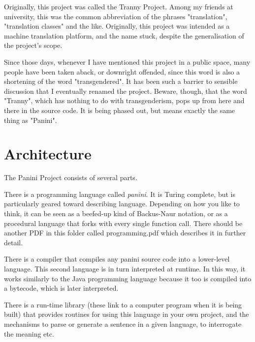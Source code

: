 \documentclass{article}
\begin{document}
Originally, this project was called the Tranny Project. Among my friends at university, this was the common abbreviation of the 
phrases "translation", "translation classes" and the like. Originally, this project was intended as a machine translation platform,
and the name stuck, despite the generalisation of the project's scope. 

Since those days, whenever I have mentioned this project in a public space, many people have been taken aback, or downright 
offended, since this word is also a shortening of the word "transgendered". It has been such a barrier to sensible discussion that I
eventually renamed the project. Beware, though, that the word "Tranny", which has nothing to do with transgenderism, pops up from 
here and there in the source code. It is being phased out, but means exactly the same thing as "Panini".

\section{Architecture}
The Panini Project consists of several parts.

There is a programming language called \emph{panini}. It is Turing complete, but is particularly geared toward describing language.
Depending on how you like to think, it can be seen as a beefed-up kind of Backus-Naur notation, or as a procedural language that 
forks with every single function call. There should be another PDF in this folder called programming.pdf which describes it in 
further detail.

There is a compiler that compiles any panini source code into a lower-level language. This second language is in turn interpreted at
runtime. In this way, it works similarly to the Java programming language because it too is compiled into a bytecode, which is later
interpreted.

There is a run-time library (these link to a computer program when it is being built) that provides routines for using this language
in your own project, and the mechanisms to parse or generate a sentence in a given language, to interrogate the meaning etc.

\label{end}
\end{document}
